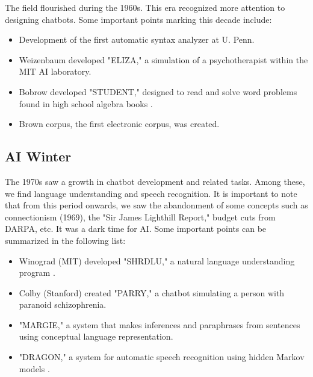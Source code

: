 \documentclass{KBook}
\begin{document}
The field flourished during the 1960s. This era recognized more attention to designing chatbots. Some important points marking this decade include:
\begin{itemize}
	\item {} Development of the first automatic syntax analyzer at U. Penn. \cite{1961-joshi,1962-harris}
	\item {} Weizenbaum developed "ELIZA," a simulation of a psychotherapist within the MIT AI laboratory.
	\item {} Bobrow developed "STUDENT," designed to read and solve word problems found in high school algebra books \cite{1964-bobrow}.
	\item {} Brown corpus, the first electronic corpus, was created.
\end{itemize}

\subsection{AI Winter}

The 1970s saw a growth in chatbot development and related tasks. Among these, we find language understanding and speech recognition. It is important to note that from this period onwards, we saw the abandonment of some concepts such as connectionism (1969), the "Sir James Lighthill Report," budget cuts from DARPA, etc. It was a dark time for AI. Some important points can be summarized in the following list:
\begin{itemize}
	\item {} Winograd (MIT) developed "SHRDLU," a natural language understanding program \cite{1971-winograd}.
	\item {} Colby (Stanford) created "PARRY," a chatbot simulating a person with paranoid schizophrenia.
	\item {} "MARGIE," a system that makes inferences and paraphrases from sentences using conceptual language representation.
	\item {} "DRAGON," a system for automatic speech recognition using hidden Markov models \cite{1975-baker}.
\end{itemize}
\end{document}
